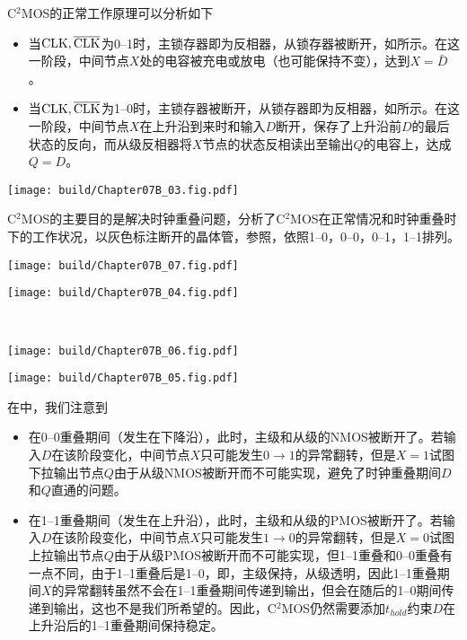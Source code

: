 C$^2$MOS的正常工作原理可以分析如下
\begin{itemize}
    \item 当$\CLK,\CLK*$为0--1时，主锁存器即为反相器，从锁存器被断开，如所示。在这一阶段，中间节点$X$处的电容被充电或放电（也可能保持不变），达到$X=\bar{D}$。
    \item 当$\CLK,\CLK*$为1--0时，主锁存器被断开，从锁存器即为反相器，如所示。在这一阶段，中间节点$X$在上升沿到来时和输入$D$断开，保存了上升沿前$D$的最后状态的反向，而从级反相器将$X$节点的状态反相读出至输出$Q$的电容上，达成$Q=D$。
\end{itemize}

\begin{Figure}
    \texttt{[image: build/Chapter07B\_03.fig.pdf]}
\end{Figure}

C$^2$MOS的主要目的是解决时钟重叠问题，分析了C$^2$MOS在正常情况和时钟重叠时下的工作状况，以灰色标注断开的晶体管，参照，依照1--0，0--0，0--1，1--1排列。

\begin{Figure}
    \begin{FigureSub}[1--0]
        \texttt{[image: build/Chapter07B\_07.fig.pdf]}
    \end{FigureSub}\hspace{0.5cm}
    \begin{FigureSub}[0--0]
        \texttt{[image: build/Chapter07B\_04.fig.pdf]}
    \end{FigureSub}\\ \vspace{0.5cm}
    \begin{FigureSub}[0--1]
        \texttt{[image: build/Chapter07B\_06.fig.pdf]}
    \end{FigureSub}\hspace{0.5cm}
    \begin{FigureSub}[1--1]
        \texttt{[image: build/Chapter07B\_05.fig.pdf]}
    \end{FigureSub}
\end{Figure}

在中，我们注意到
\begin{itemize}
    \item 在0--0重叠期间（发生在下降沿），此时，主级和从级的NMOS被断开了。若输入$D$在该阶段变化，中间节点$X$只可能发生$0\to 1$的异常翻转，但是$X=1$试图下拉输出节点$Q$由于从级NMOS被断开而不可能实现，避免了时钟重叠期间$D$和$Q$直通的问题。
    \item 在1--1重叠期间（发生在上升沿），此时，主级和从级的PMOS被断开了。若输入$D$在该阶段变化，中间节点$X$只可能发生$1\to 0$的异常翻转，但是$X=0$试图上拉输出节点$Q$由于从级PMOS被断开而不可能实现，但1--1重叠和0--0重叠有一点不同，由于1--1重叠后是1--0，即，主级保持，从级透明，因此1--1重叠期间$X$的异常翻转虽然不会在1--1重叠期间传递到输出，但会在随后的1--0期间传递到输出，这也不是我们所希望的。因此，C$^2$MOS仍然需要添加$t_{hold}$约束$D$在上升沿后的1--1重叠期间保持稳定。
\end{itemize}


